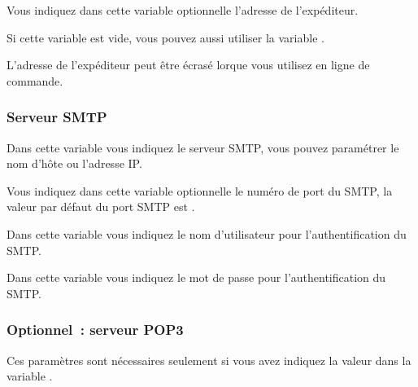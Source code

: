\begin {description}

    Vous indiquez dans cette variable optionnelle l'adresse de l'expéditeur.

    Si cette variable est vide, vous pouvez aussi utiliser la variable
    .

    L'adresse de l'expéditeur peut être écrasé lorque vous utilisez
	 en ligne de commande.

\end{description}

\subsubsection {Serveur SMTP}
\begin {description}


    Dans cette variable vous indiquez le serveur SMTP, vous pouvez paramétrer
	le nom d'hôte ou l'adresse IP.


    Vous indiquez dans cette variable optionnelle le numéro de port du SMTP,
	la valeur par défaut du port SMTP est .


    Dans cette variable vous indiquez le nom d'utilisateur pour l'authentification
	du SMTP.


    Dans cette variable vous indiquez le mot de passe pour l'authentification
	du SMTP.

\end {description}

\subsubsection {Optionnel~: serveur POP3}

    Ces paramètres sont nécessaires seulement si vous avez indiquez la valeur 
	dans la variable .

